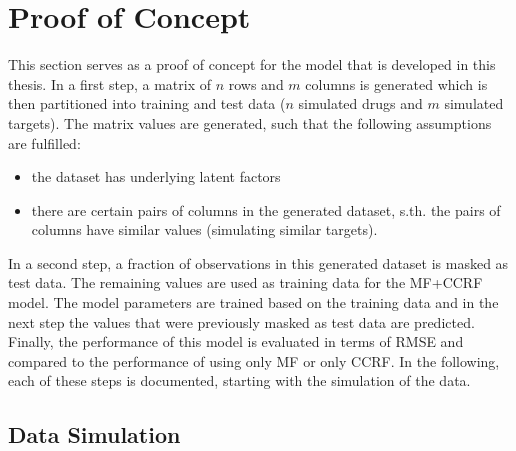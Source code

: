 \section{Proof of Concept}

This section serves as a proof of concept for the model that is developed in this thesis. In a first step, a matrix of $n$ rows and $m$ columns is generated which is then partitioned into training and test data ($n$ simulated drugs and $m$ simulated targets). The matrix values are generated, such that the following assumptions are fulfilled:

\begin{itemize}
\item the dataset has underlying latent factors
\item there are certain pairs of columns in the generated dataset, s.th. the pairs of columns have similar values (simulating similar targets).
\end{itemize}

In a second step, a fraction of observations in this generated dataset is masked as test data. The remaining values are used as training data for the MF+CCRF model. The model parameters are trained based on the training data and in the next step the values that were previously masked as test data are predicted. Finally, the performance of this model is evaluated in terms of RMSE and compared to the performance of using only MF or only CCRF.
In the following, each of these steps is documented, starting with the simulation of the data.

\subsection{Data Simulation}


